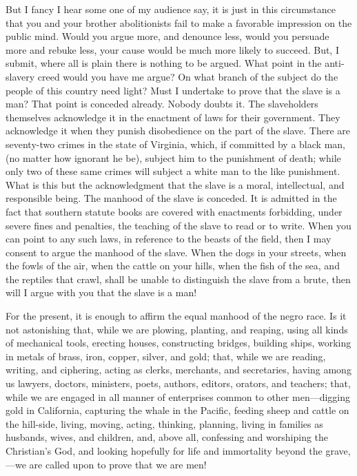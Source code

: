 But I fancy I hear some one of my audience say, it is just in this
circumstance that you and your brother abolitionists fail to make a
favorable impression on the public mind. Would you argue more, and
denounce less, would you persuade more and rebuke less, your cause
would be much more likely to succeed. But, I submit, where all is
plain there is nothing to be argued. What point in the anti-slavery
creed would you have me argue? On what branch of the subject do the
people of this country need light? Must I undertake to prove that the
slave is a man? That point is conceded already. Nobody doubts it. The
slaveholders themselves acknowledge it in the enactment of laws for
their government. They acknowledge it when they punish disobedience on
the part of the slave. There are seventy-two crimes in the state of
Virginia, which, if committed by a black man, (no matter how ignorant
he be), subject him to the punishment of death; while only two of
these same crimes will subject a white man to the like punishment.
What is this but the acknowledgment that the slave is a moral,
intellectual, and responsible being. The manhood of the slave is
conceded. It is admitted in the fact that southern statute books are
covered with enactments forbidding, under severe fines and penalties,
the teaching of the slave to read or to write. When you can point to
any such laws, in reference to the beasts of the field, then I may
consent to argue the manhood of the slave. When the dogs in your
streets, when the fowls of the air, when the cattle on your hills,
when the fish of the sea, and the reptiles that crawl, shall be unable
to distinguish the slave from a brute, then will I argue with you that
the slave is a man!


For the present, it is enough to affirm the equal manhood of the negro
race. Is it not astonishing that, while we are plowing, planting, and
reaping, using all kinds of mechanical tools, erecting houses,
constructing bridges, building ships, working in metals of brass,
iron, copper, silver, and gold; that, while we are reading, writing,
and ciphering, acting as clerks, merchants, and secretaries, having
among us lawyers, doctors, ministers, poets, authors, editors,
orators, and teachers; that, while we are engaged in all manner of
enterprises common to other men---digging gold in California,
capturing the whale in the Pacific, feeding sheep and cattle on the
hill-side, living, moving, acting, thinking, planning,
living in families as husbands, wives, and children, and, above all,
confessing and worshiping the Christian's God, and looking hopefully
for life and immortality beyond the grave,---we are called upon to
prove that we are men!

